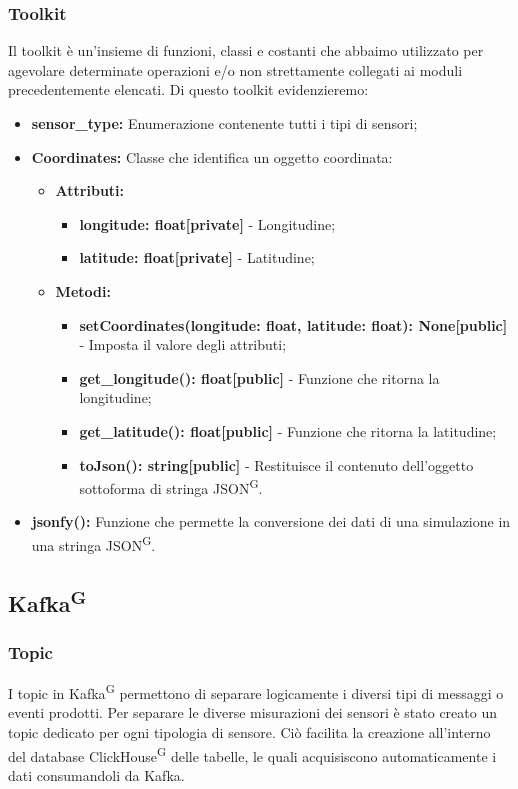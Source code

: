 \documentclass[8pt]{article}
\newcommand{\glossterm}[1]{#1\textsuperscript{G}} %
\begin{document}
\subsubsection{Toolkit}
Il toolkit è un'insieme di funzioni, classi e costanti che abbaimo utilizzato per agevolare determinate operazioni e/o non strettamente collegati ai moduli precedentemente elencati.
Di questo toolkit evidenzieremo:
\begin{itemize}
    \item \textbf{sensor\_type:} Enumerazione contenente tutti i tipi di sensori;
    \item \textbf{Coordinates:} Classe che identifica un oggetto coordinata:
    \begin{itemize}
        \item \textbf{Attributi:}
        \begin{itemize}
            \item \textbf{longitude: float[private]} - Longitudine;
            \item \textbf{latitude: float[private]} - Latitudine;
        \end{itemize}
        \item \textbf{Metodi:}
        \begin{itemize}
            \item \textbf{setCoordinates(longitude: float, latitude: float): None[public]} - Imposta il valore degli attributi;
            \item \textbf{get\_longitude(): float[public]} - Funzione che ritorna la longitudine;
            \item \textbf{get\_latitude(): float[public]} - Funzione che ritorna la latitudine;
            \item \textbf{toJson(): string[public]} - Restituisce il contenuto dell'oggetto sottoforma di stringa \glossterm{JSON}.
        \end{itemize}
    \end{itemize}
    \item \textbf{jsonfy():} Funzione che permette la conversione dei dati di una simulazione in una stringa \glossterm{JSON}.
\end{itemize}
\clearpage
\subsection{\glossterm{Kafka}}
\subsubsection{Topic}
I topic in \glossterm{Kafka} permettono di separare logicamente i diversi tipi di messaggi o eventi prodotti. Per separare le diverse misurazioni dei sensori è stato creato un topic dedicato per ogni tipologia di sensore.
Ciò facilita la creazione all’interno del database \glossterm{ClickHouse} delle tabelle, le quali acquisiscono automaticamente i dati consumandoli da Kafka.
\end{document}
